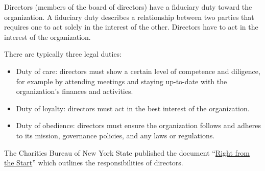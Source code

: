 \begin{kaobox}[frametitle=Director responsibilities]

Directors (members of the board of directors) have a fiduciary duty toward the organization.  A fiduciary duty describes a relationship between two parties that requires one to act solely in the interest of the other.  Directors have to act in the interest of the organization.

There are typically three legal duties:

\begin{itemize}

\item Duty of care: directors must show a certain level of competence and diligence, for example by attending meetings and staying up-to-date with the organization's finances and activities.

\item Duty of loyalty: directors must act in the best interest of the organization.

\item Duty of obedience: directors must ensure the organization follows and adheres to its mission, governance policies, and any laws or regulations.

\end{itemize}

The Charities Bureau of New York State published the document ``\href{https://www.charitiesnys.com/pdfs/Right-From-the-Start.pdf}{Right from the Start}'' which outlines the responsibilities of directors.

\end{kaobox}

